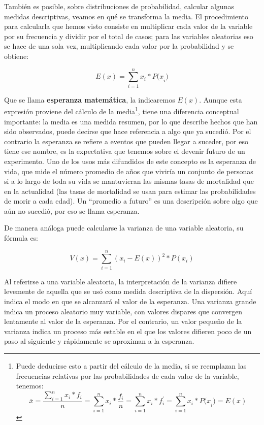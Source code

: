 \documentclass[]{article}
\let\rmarkdownfootnote\footnote%
\def\footnote{\protect\rmarkdownfootnote}
\begin{document}
También es posible, sobre distribuciones de probabilidad, calcular
algunas medidas descriptivas, veamos en qué se transforma la media. El
procedimiento para calcularla que hemos visto consiste en multiplicar
cada valor de la variable por su frecuencia y dividir por el total de
casos; para las variables aleatorias eso se hace de una sola vez,
multiplicando cada valor por la probabilidad y se obtiene:

\[E(x) = \sum_{i = 1}^{n}x_{i}*{P(x}_{i})\]

Que se llama \textbf{esperanza matemática}, la indicaremos \(E(x)\).
Aunque esta expresión proviene del cálculo de la media\footnote{Puede
  deducirse esto a partir del cálculo de la media, si se reemplazan las
  frecuencias relativas por las probabilidades de cada valor de la
  variable, tenemos:
  \[\overline{x} = \frac{\sum_{i = 1}^{n}{x_{i}*f_{i}}}{n} = \sum_{i = 1}^{n}x_{i}*\frac{f_{i}}{n} = \sum_{i = 1}^{n}x_{i}*f_{i}^{'} = \sum_{i = 1}^{n}x_{i}*{P(x}_{i}) = E(x)\]},
tiene una diferencia conceptual importante: la media es una medida
resumen, por lo que describe hechos que han sido observados, puede
decirse que hace referencia a algo que ya sucedió. Por el contrario la
esperanza se refiere a eventos que pueden llegar a suceder, por eso
tiene ese nombre, es la expectativa que tenemos sobre el devenir futuro
de un experimento. Uno de los usos más difundidos de este concepto es la
esperanza de vida, que mide el número promedio de años que viviría un
conjunto de personas si a lo largo de toda su vida se mantuvieran las
mismas tasas de mortalidad que en la actualidad (las tasas de mortalidad
se usan para estimar las probabilidades de morir a cada edad). Un
``promedio a futuro'' es una descripción sobre algo que aún no sucedió,
por eso se llama esperanza.

De manera análoga puede calcularse la varianza de una variable
aleatoria, su fórmula es:

\[V(x)=\sum_{i=1}^{n}(x_i-E(x))^{2}*P(x_i)\]

Al referirse a una variable aleatoria, la interpretación de la varianza
difiere levemente de aquella que se usó como medida descriptiva de la
dispersión. Aquí indica el modo en que se alcanzará el valor de la
esperanza. Una varianza grande indica un proceso aleatorio muy variable,
con valores dispares que convergen lentamente al valor de la esperanza.
Por el contrario, un valor pequeño de la varianza indica un proceso más
estable en el que los valores difieren poco de un paso al siguiente y
rápidamente se aproximan a la esperanza.
\end{document}
